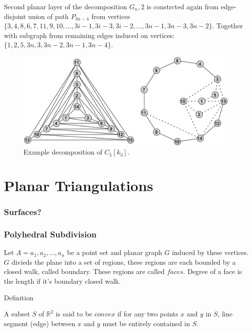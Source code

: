 \begin{enumerate}
Second planar layer of the decomposition $G_n,2$ is constrcted again from edge-disjoint union of path $P_{3n-4}$ from vertices $\{ 3, 4, 8, 6, 7, 11, 9, 10,\dots,3i - 1, 3i − 3, 3i − 2,\dots, 3n - 1, 3n - 3, 3n - 2 \}$. Together with subgraph from remaining edges induced on vertices: $\{ 1,2,5,3n, 3, 3n - 2, 3n - 1,3n - 4 \}$. \parencite{boutin2008thickness}

\begin{figure}[H]
\includegraphics[width=\textwidth]{images/catlinDecomposition.PNG}
\caption{Example decomposition of $C_5[k_3]$\parencite{boutin2008thickness}.}
\end{figure}

\end{enumerate}

\section{Planar Triangulations}

\subsubsection{Surfaces?}

\subsubsection{Polyhedral Subdivision}

Let $A = a_1, a_2,\dots, a_n$ be a point set and planar graph $G$ induced by these vertices. $G$ divieds the plane into a set of regions, these regions are each bounded by a closed walk, called boundary. These regions are called $faces$. Degree of a face is the length if it's boundary closed walk. \parencite{planarGraphs2001fleck}

Definition

A subset $S$ of $\mathbb{R}^2$ is said to be $convex$ if for any two points $x$ and $y$ in $S$, line segment (edge) between $x$ and $y$ must be entirely contained in $S$.\parencite{computingCH2003smid}
 
